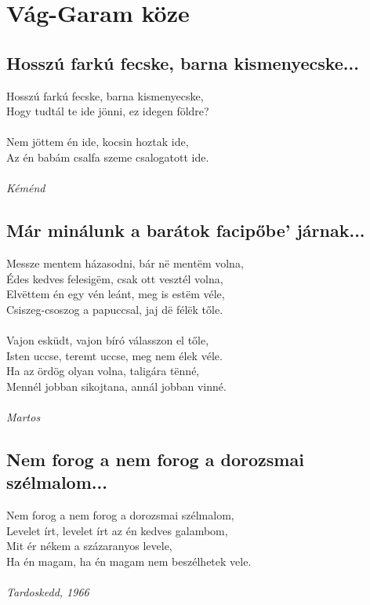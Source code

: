 \chapter{Vág-Garam köze}
\section{Hosszú farkú fecske, barna kismenyecske...}
Hosszú farkú fecske, barna kismenyecske,\\
Hogy tudtál te ide jönni, ez idegen földre?\\\\
Nem jöttem én ide, kocsin hoztak ide,\\
Az én babám csalfa szeme csalogatott ide.\\\\
\textit{Kéménd}

\section{Már minálunk a barátok facipőbe' járnak...}
Messze mentem házasodni, bár në mentëm volna,\\
Édes kedves felesigëm, csak ott vesztél volna,\\
Elvëttem én egy vén leánt, meg is estëm véle,\\
Csiszeg-csoszog a papuccsal, jaj dë félëk tőle.\\\\
Vajon esküdt, vajon bíró válasszon el tőle,\\
Isten uccse, teremt uccse, meg nem élek véle.\\
Ha az ördög olyan volna, taligára tënné,\\
Mennél jobban sikojtana, annál jobban vinné.\\\\
\textit{Martos}

\section{Nem forog a nem forog a dorozsmai szélmalom...}
Nem forog a nem forog a dorozsmai szélmalom,\\
Levelet írt, levelet írt az én kedves galambom,\\
Mit ér nékem a százaranyos levele,\\
Ha én magam, ha én magam nem beszélhetek vele.\\\\
\textit{Tardoskedd, 1966}

